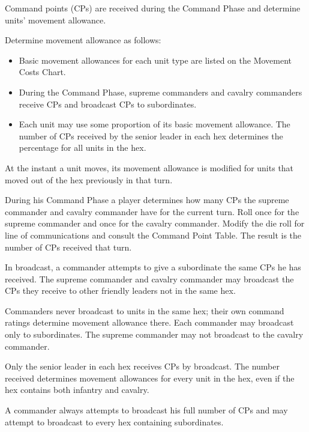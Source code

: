 
Command points (CPs) are received during the Command Phase and determine units' movement allowance.


Determine movement allowance as follows:
\begin{itemize}
\item Basic movement allowances for each unit type are listed on the Movement Costs Chart.
\item During the Command Phase, supreme commanders and cavalry commanders receive CPs and broadcast CPs to subordinates.
\item Each unit may use some proportion of its basic movement allowance. The number of CPs received by the senior leader in each hex determines the percentage for all units in the hex.
\end{itemize}


At the instant a unit moves, its movement allowance is modified for units that moved out of the hex previously in that turn.


During his Command Phase a player determines how many CPs the supreme commander and cavalry commander have for the current turn. Roll once for the supreme commander and once for the cavalry commander. Modify the die roll for line of communications and consult the Command Point Table. The result is the number of CPs received that turn.


In broadcast, a commander attempts to give a subordinate the same CPs he has received. The supreme commander and cavalry commander may broadcast the CPs they receive to other friendly leaders not in the same hex.

Commanders never broadcast to units in the same hex; their own command ratings determine movement allowance there. Each commander may broadcast only to subordinates. The supreme commander may not broadcast to the cavalry commander.

Only the senior leader in each hex receives CPs by broadcast. The number received determines movement allowances for every unit in the hex, even if the hex contains both infantry and cavalry.

A commander always attempts to broadcast his full number of CPs and may attempt to broadcast to every hex containing subordinates.

